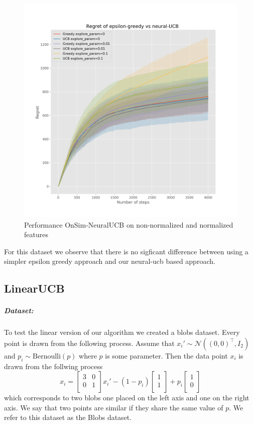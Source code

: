 \documentclass{article}
\begin{document}
\begin{figure}[!h]
\begin{minipage}{.45\textwidth}
    \includegraphics[width=\linewidth]{online-epsilon-vs-neural-reduced-normalized-ci}
  \end{minipage}
  \caption{Performance OnSim-NeuralUCB on non-normalized and normalized features}\label{fig:online-epsilon-vs-neural-ci}
\end{figure}

For this dataset we observe that there is no sigficant difference between using a simpler epsilon greedy approach
and our neural-ucb  based approach.
\subsection{LinearUCB}
\subparagraph{Dataset:}
To test the linear version of our algorithm we created a blobs dataset.
Every point is drawn from the following process. Assume that $x_i' \sim \mathcal{N}((0, 0)^\top,I_2)$ and $p_i \sim \text{Bernoulli}(p)$ where $p$ is
some parameter.
Then the data point $x_i$ is drawn from the follwing process
\[x_i = \begin{bmatrix} 3 & 0\\ 0 & 1\\ \end{bmatrix} x_i' -(1-p_i)
\begin{bmatrix}
1\\
1\\
\end{bmatrix}
+ p_i
\begin{bmatrix}
1\\
0\\
\end{bmatrix}
\]
which corresponds to two blobs one placed on the left axis and one on the right axis.
We say that two points are similar if they share the same value of $p$.
We refer to this dataset as the Blobs dataset.
\end{document}
